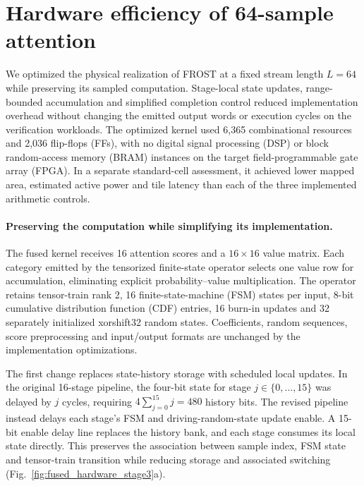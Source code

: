 \section{Hardware efficiency of 64-sample attention}
\label{sec:fpga_evaluation}

We optimized the physical realization of FROST at a fixed stream length
$L=64$ while preserving its sampled computation. Stage-local state
updates, range-bounded accumulation and simplified completion control
reduced implementation overhead without changing the emitted output
words or execution cycles on the verification workloads. The optimized
kernel used 6,365 combinational resources and 2,036 flip-flops (FFs),
with no digital signal processing (DSP) or block random-access memory
(BRAM) instances on the target field-programmable gate array (FPGA).
In a separate standard-cell assessment, it achieved lower mapped area,
estimated active power and tile latency than each of the three
implemented arithmetic controls.

\paragraph{Preserving the computation while simplifying its implementation.}
The fused kernel receives 16 attention scores and a $16\times16$ value
matrix. Each category emitted by the tensorized finite-state operator
selects one value row for accumulation, eliminating explicit
probability--value multiplication. The operator retains tensor-train
rank 2, 16 finite-state-machine (FSM) states per input, 8-bit cumulative
distribution function (CDF) entries, 16 burn-in updates and 32 separately
initialized xorshift32 random states. Coefficients, random sequences,
score preprocessing and input/output formats are unchanged by the
implementation optimizations.

The first change replaces state-history storage with scheduled local
updates. In the original 16-stage pipeline, the four-bit state for stage
$j\in\{0,\ldots,15\}$ was delayed by $j$ cycles, requiring
$4\sum_{j=0}^{15}j=480$ history bits. The revised pipeline instead delays
each stage's FSM and driving-random-state update enable. A 15-bit enable
delay line replaces the history bank, and each stage consumes its local
state directly. This preserves the association between sample index,
FSM state and tensor-train transition while reducing storage and
associated switching (Fig.~\ref{fig:fused_hardware_stage3}a).

